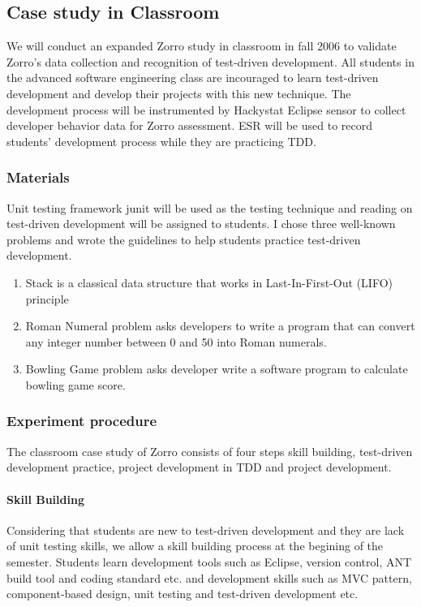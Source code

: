 \subsection{Case study in Classroom}
We will conduct an expanded Zorro study in classroom in fall 2006 to
validate Zorro's data collection and recognition of test-driven
development. All students in the advanced software engineering class are
incouraged to learn test-driven development and develop their projects with
this new technique. The development process will be instrumented by
Hackystat Eclipse sensor to collect developer behavior data for Zorro
assessment. ESR will be used to record students' development process while
they are practicing TDD. 

\subsubsection{Materials}
Unit testing framework junit will be used as the testing technique and
reading on test-driven development will be assigned to students. I chose
three well-known problems and wrote the guidelines to help students practice
test-driven development.
\begin{enumerate}
\item{Stack is a classical data structure that works in Last-In-First-Out
    (LIFO) principle}
\item{Roman Numeral problem asks developers to write a program that can
    convert any integer number between 0 and 50 into Roman numerals.}
\item{Bowling Game problem asks developer write a software program to
    calculate bowling game score.}
\end{enumerate}

\subsubsection{Experiment procedure}
The classroom case study of Zorro consists of four steps skill building,
test-driven development practice, project development in TDD and project
development.
\paragraph{Skill Building}
Considering that students are new to test-driven development and they are
lack of unit testing skills, we allow a skill building process at the
begining of the semester. Students learn development tools such as Eclipse,
version control, ANT build tool and coding standard etc. and development
skills such as MVC pattern, component-based design, unit testing and
test-driven development etc.
